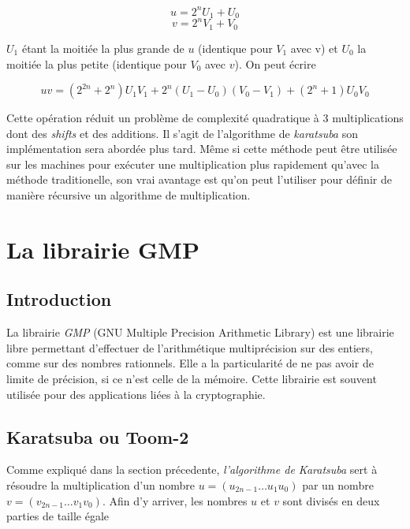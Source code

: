 \documentclass[letterpaper]{article}
\begin{document}
  $$u = 2^{n} U_1 + U_0$$
  $$v = 2^{n} V_1 + V_0$$

$U_1$ étant la moitiée la plus grande de $u$ (identique pour $V_1$ avec v) et
$U_0$ la moitiée la plus petite (identique pour $V_0$ avec $v$). On peut écrire

  $$uv = (2^{2n} + 2^n) U_1 V_1 + 2^n (U_1 - U_0) (V_0 - V_1) + (2^n + 1) U_0 V_0$$

Cette opération réduit un problème de complexité quadratique à 3 multiplications
dont des \emph{shifts} et des additions. Il s'agit de l'algorithme de
\emph{karatsuba} son implémentation sera abordée plus tard.
\newline
Même si cette méthode peut être utilisée sur les machines pour exécuter une
multiplication plus rapidement qu'avec la méthode traditionelle, son vrai
avantage est qu'on peut l'utiliser pour définir de manière récursive un
algorithme de multiplication.


\section{La librairie GMP}
\subsection{Introduction}

La librairie \emph{GMP} (GNU Multiple Precision Arithmetic Library) est une
librairie libre permettant d'effectuer de l'arithmétique multiprécision sur
des entiers, comme sur des nombres rationnels. Elle a la particularité de ne pas
avoir de limite de précision, si ce n'est celle de la mémoire.
\newline
Cette librairie est souvent utilisée pour des applications liées à la
cryptographie\cite{wikigmp}.

\subsection{Karatsuba ou Toom-2}

Comme expliqué dans la section précedente, \emph{l'algorithme de Karatsuba} sert
à résoudre la multiplication d'un nombre $u = (u_{2n-1} \dots u_1 u_0)$ par un
nombre $v = (v_{2n-1} \dots v_1 v_0)$. Afin d'y arriver, les nombres $u$ et $v$
sont divisés en deux parties de taille égale
\end{document}
